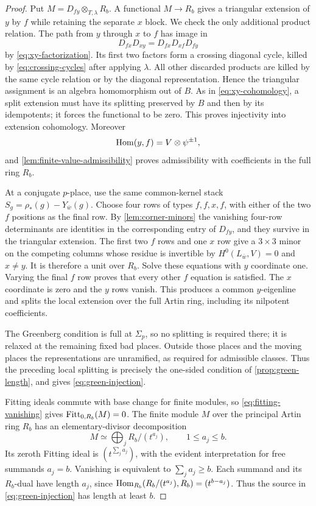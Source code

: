 \begin{proof}
Put $M=D_{fy}\otimes_{T,\lambda}R_b$.  A functional $M\to R_b$
gives a triangular extension of $y$ by $f$ while retaining the
separate $x$ block.  We check the only additional product relation.
The path from $y$ through $x$ to $f$ has image in
\[
 D_{fx}D_{xy}=D_{fx}D_{xf}D_{fy}
\]
by \cref{eq:xy-factorization}.  Its first two factors form a crossing
diagonal cycle, killed by \cref{eq:crossing-cycles} after applying
$\lambda$.  All other discarded products are killed by the same
cycle relation or by the diagonal representation.  Hence the
triangular assignment is an algebra homomorphism out of $B$.
As in \cref{eq:xy-cohomology}, a split extension must have its
splitting preserved by $B$ and then by its idempotents; it forces
the functional to be zero.  This proves injectivity into extension
cohomology.  Moreover
\[
                  \operatorname{Hom}(y,f)=V\otimes\psi^{\pm1},
\]
and \cref{lem:finite-value-admissibility} proves admissibility with
coefficients in the full ring $R_b$.

At a conjugate $p$-place, use the same common-kernel stack
$S_g=\rho_*(g)-Y_{\bar w}(g)$.  Choose four rows of types
$f,f,x,f$, with either of the two $f$ positions as the final row.
By \cref{lem:corner-minors} the vanishing four-row determinants are
identities in the corresponding entry of $D_{fy}$, and they
survive in the triangular extension.  The first two $f$ rows and
one $x$ row give a $3\times3$ minor on the competing columns whose
residue is invertible by $H^0(L_{\bar w},V)=0$ and $x\ne y$.
It is therefore a unit over $R_b$.  Solve these equations with
$y$ coordinate one.  Varying the final $f$ row proves that every
other $f$ equation is satisfied.  The $x$ coordinate is zero and
the $y$ rows vanish.  This produces a common $y$-eigenline and
splits the local extension over the full Artin ring, including its
nilpotent coefficients.

The Greenberg condition is full at $\Sigma_p$, so no splitting is
required there; it is relaxed at the remaining fixed bad places.
Outside those places and the moving places the representations are
unramified, as required for admissible classes.  Thus the preceding
local splitting is precisely the one-sided condition of
\cref{prop:green-length}, and gives \cref{eq:green-injection}.

Fitting ideals commute with base change for finite modules, so
\cref{eq:fitting-vanishing} gives $\operatorname{Fitt}_{0,R_b}(M)=0$.
The finite module $M$ over the principal Artin ring $R_b$ has an
elementary-divisor decomposition
\[
              M\simeq\bigoplus_j R_b/(t^{a_j}),
                   \qquad 1\leq a_j\leq b.
\]
Its zeroth Fitting ideal is $(t^{\sum_j a_j})$, with the evident
interpretation for free summands $a_j=b$.  Vanishing is equivalent
to $\sum_j a_j\geq b$.  Each summand and its $R_b$-dual have length
$a_j$, since $\operatorname{Hom}_{R_b}(R_b/(t^{a_j}),R_b)=(t^{b-a_j})$.
Thus the source in \cref{eq:green-injection} has length at least $b$.
\end{proof}

